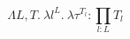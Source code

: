 \begin{equation}
  \Lambda L, T.\ \lambda l^{L}.\ \lambda \tau^{T_l} : \prod _{l : L} T_l
\end{equation}